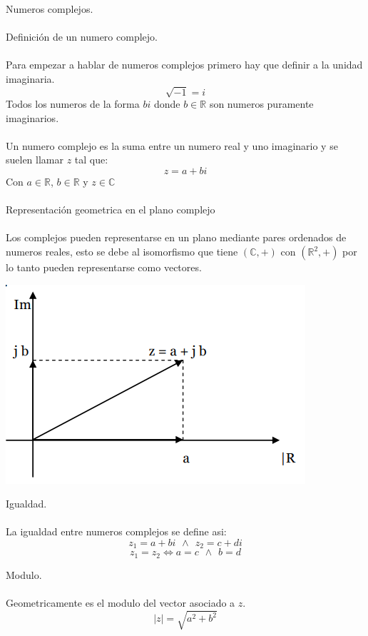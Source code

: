 \documentclass[]{article}
\begin{document}
\huge Numeros complejos.
\\
\\
\Large Definición de un numero complejo.
\normalsize
\\
\\
Para empezar a hablar de numeros complejos primero hay que definir a la unidad imaginaria.
$$
\sqrt{-1} = i
$$
Todos los numeros de la forma $bi$ donde $b \in \mathbb{R}$ son numeros puramente imaginarios.
\\
\\
Un numero complejo es la suma entre un numero real y uno imaginario y se suelen llamar $z$ tal que:
$$
z=a+bi
$$
Con $a \in \mathbb{R}$, $b \in \mathbb{R} $ y $z \in \mathbb{C}$
\\
\\
\Large Representación geometrica en el plano complejo
\normalsize
\\
\\
Los complejos pueden representarse en un plano mediante pares ordenados de numeros reales, esto se debe al isomorfismo que tiene $(\mathbb{C},+)$ con $(\mathbb{R}^{2},+)$ por lo tanto pueden representarse como vectores.

\includegraphics{../../../Imagenes/Superior/Complejos/Complejos01.PNG}


\Large Igualdad.
\normalsize
\\
\\
La igualdad entre numeros complejos se define asi:
$$
z_1 = a+bi \hspace{5pt}\wedge\hspace{5pt} z_2=c+di
$$
$$
z_1 = z_2 \Leftrightarrow a = c \hspace{5pt}\wedge\hspace{5pt} b = d
$$

\Large Modulo.
\normalsize
\\
\\
Geometricamente es el modulo del vector asociado a $z$.
$$
|z| = \sqrt{a^{2}+b^{2}}
$$
\end{document}
